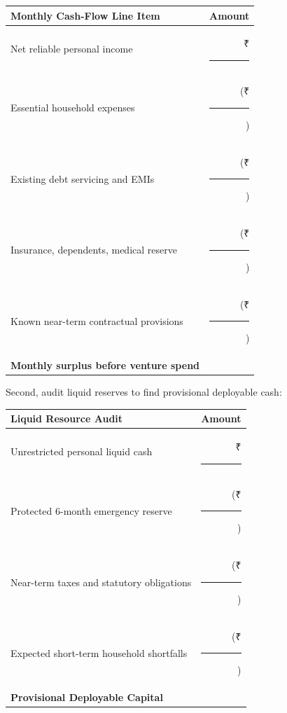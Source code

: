 \begin{tcolorbox}[
  enhanced,
  colback=white,
  colframe=BayesBorder!80!white,
  boxrule=0.4pt,
  arc=2pt,
  left=4pt,right=4pt,top=4pt,bottom=4pt,
  before skip=3pt,after skip=4pt
]
\scriptsize
\setlength{\tabcolsep}{3pt}
\renewcommand{\arraystretch}{1.15}
\begin{tabularx}{\linewidth}{@{} X r @{}}
\toprule
\textbf{Monthly Cash-Flow Line Item} & \textbf{Amount} \\
\midrule
Net reliable personal income & ₹\rule{2.2cm}{0.3pt} \\
Essential household expenses & (₹\rule{2.0cm}{0.3pt}) \\
Existing debt servicing and EMIs & (₹\rule{2.0cm}{0.3pt}) \\
Insurance, dependents, medical reserve & (₹\rule{2.0cm}{0.3pt}) \\
Known near-term contractual provisions & (₹\rule{2.0cm}{0.3pt}) \\
\midrule
\textbf{Monthly surplus before venture spend} & \textbf{₹\rule{2.0cm}{0.3pt}} \\
\bottomrule
\end{tabularx}
\end{tcolorbox}

Second, audit liquid reserves to find provisional deployable cash:

\begin{tcolorbox}[
  enhanced,
  colback=white,
  colframe=BayesBorder!80!white,
  boxrule=0.4pt,
  arc=2pt,
  left=4pt,right=4pt,top=4pt,bottom=4pt,
  before skip=3pt,after skip=5pt
]
\scriptsize
\setlength{\tabcolsep}{3pt}
\renewcommand{\arraystretch}{1.15}
\begin{tabularx}{\linewidth}{@{} X r @{}}
\toprule
\textbf{Liquid Resource Audit} & \textbf{Amount} \\
\midrule
Unrestricted personal liquid cash & ₹\rule{2.2cm}{0.3pt} \\
Protected 6-month emergency reserve & (₹\rule{2.0cm}{0.3pt}) \\
Near-term taxes and statutory obligations & (₹\rule{2.0cm}{0.3pt}) \\
Expected short-term household shortfalls & (₹\rule{2.0cm}{0.3pt}) \\
\midrule
\textbf{Provisional Deployable Capital} & \textbf{₹\rule{2.0cm}{0.3pt}} \\
\bottomrule
\end{tabularx}
\end{tcolorbox}

